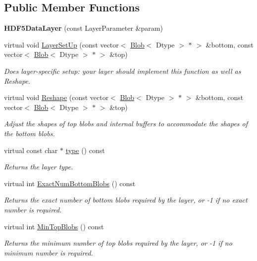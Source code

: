 \subsection*{Public Member Functions}
\begin{DoxyCompactItemize}
\item 
{\bfseries H\+D\+F5\+Data\+Layer} (const Layer\+Parameter \&param)\hypertarget{classcaffe_1_1HDF5DataLayer_abfc7dcc4f07c228eb0deb1e0dfae1a5f}{}\label{classcaffe_1_1HDF5DataLayer_abfc7dcc4f07c228eb0deb1e0dfae1a5f}

\item 
virtual void \hyperlink{classcaffe_1_1HDF5DataLayer_a2422001e2f11da551cd4a4f7d3b43083}{Layer\+Set\+Up} (const vector$<$ \hyperlink{classcaffe_1_1Blob}{Blob}$<$ Dtype $>$ $\ast$ $>$ \&bottom, const vector$<$ \hyperlink{classcaffe_1_1Blob}{Blob}$<$ Dtype $>$ $\ast$ $>$ \&top)
\begin{DoxyCompactList}\small\item\em Does layer-\/specific setup\+: your layer should implement this function as well as Reshape. \end{DoxyCompactList}\item 
virtual void \hyperlink{classcaffe_1_1HDF5DataLayer_a5f036a0ee6132104ee6f1bfe2850fbcd}{Reshape} (const vector$<$ \hyperlink{classcaffe_1_1Blob}{Blob}$<$ Dtype $>$ $\ast$ $>$ \&bottom, const vector$<$ \hyperlink{classcaffe_1_1Blob}{Blob}$<$ Dtype $>$ $\ast$ $>$ \&top)
\begin{DoxyCompactList}\small\item\em Adjust the shapes of top blobs and internal buffers to accommodate the shapes of the bottom blobs. \end{DoxyCompactList}\item 
virtual const char $\ast$ \hyperlink{classcaffe_1_1HDF5DataLayer_af4e5df6d3dc0b342fe6eff3b1f7fd045}{type} () const \hypertarget{classcaffe_1_1HDF5DataLayer_af4e5df6d3dc0b342fe6eff3b1f7fd045}{}\label{classcaffe_1_1HDF5DataLayer_af4e5df6d3dc0b342fe6eff3b1f7fd045}

\begin{DoxyCompactList}\small\item\em Returns the layer type. \end{DoxyCompactList}\item 
virtual int \hyperlink{classcaffe_1_1HDF5DataLayer_a800a76c3afa9d5ac8042fa08d01b3bef}{Exact\+Num\+Bottom\+Blobs} () const 
\begin{DoxyCompactList}\small\item\em Returns the exact number of bottom blobs required by the layer, or -\/1 if no exact number is required. \end{DoxyCompactList}\item 
virtual int \hyperlink{classcaffe_1_1HDF5DataLayer_a5ee39cf7a1b4558811fe56bcec3c1fbe}{Min\+Top\+Blobs} () const 
\begin{DoxyCompactList}\small\item\em Returns the minimum number of top blobs required by the layer, or -\/1 if no minimum number is required. \end{DoxyCompactList}\end{DoxyCompactItemize}
